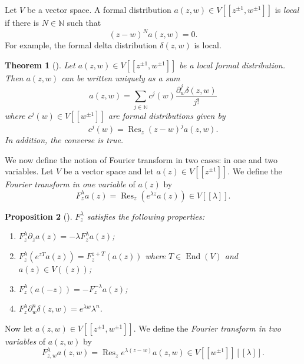 \documentclass[a4paper, 12pt, reqno]{amsart}
\newtheorem{theorem}{Theorem}[subsection]
\newtheorem{proposition}[theorem]{Proposition}
\theoremstyle{remark}
\numberwithin{equation}{subsection}
\DeclareMathOperator{\End}{End}
\DeclareMathOperator{\Res}{Res}
\begin{document}
Let $V$ be a vector space.
A formal distribution $a(z, w) \in V[[z^{\pm 1}, w^{\pm 1}]]$ is \emph{local} if there is $N \in \mathbb{N}$ such that
\begin{equation*}
  (z - w)^Na(z, w)=0.
\end{equation*}
For example, the formal delta distribution $\delta(z, w)$ is local.

\begin{theorem}[{\cite[Proposition 2.2]{kac_vertex_1998}}]
  \label{thr:1}
  Let $a(z, w) \in V[[z^{\pm 1}, w^{\pm 1}]]$ be a local formal distribution.
  Then $a(z, w)$ can be written uniquely as a sum
  \begin{equation}
    \label{eq:1}
    a(z, w) = \sum_{j \in \mathbb{N}}c^j(w)\frac{\partial_w^j\delta(z, w)}{j!}
  \end{equation}
  where $c^j(w) \in V[[w^{\pm 1}]]$ are formal distributions given by
  \begin{equation}
    \label{eq:2}
    c^j(w) = \Res_z(z - w)^ja(z, w).
  \end{equation}
  In addition, the converse is true.
\end{theorem}

We now define the notion of Fourier transform in two cases: in one and two variables. Let $V$ be a vector space and let $a(z) \in V[[z^{\pm 1}]]$.
We define the \emph{Fourier transform in one variable} of $a(z)$ by
\begin{equation*}
  F^\lambda_za(z) = \Res_z(e^{\lambda z}a(z)) \in V[[\lambda]].
\end{equation*}
\begin{proposition}[{\cite[Proposition 1.5.2]{nozaradan_introduction_2008}}]
  \label{prp:1}
  $F^\lambda_z$ satisfies the following properties:
  \begin{enumerate}[label = (\alph*)]
  \item $F^\lambda_z\partial_za(z) = -\lambda F^\lambda_za(z)$;
  \item $F^\lambda_z(e^{zT}a(z)) = F^{z + T}_z(a(z))$ where $T \in \End(V)$ and $a(z) \in V((z))$;
  \item $F^\lambda_z(a(-z)) = -F^{-\lambda}_za(z)$;
  \item $F^\lambda_z\partial^n_w\delta(z, w) = e^{\lambda w}\lambda^n$.
  \end{enumerate}
\end{proposition}

Now let $a(z, w) \in V[[z^{\pm 1}, w^{\pm 1}]]$.
We define the \emph{Fourier transform in two variables} of $a(z, w)$ by
\begin{equation*}
  F^\lambda_{z, w}a(z, w) = \Res_ze^{\lambda(z - w)}a(z, w) \in V[[w^{\pm 1}]][[\lambda]].
\end{equation*}
\end{document}
